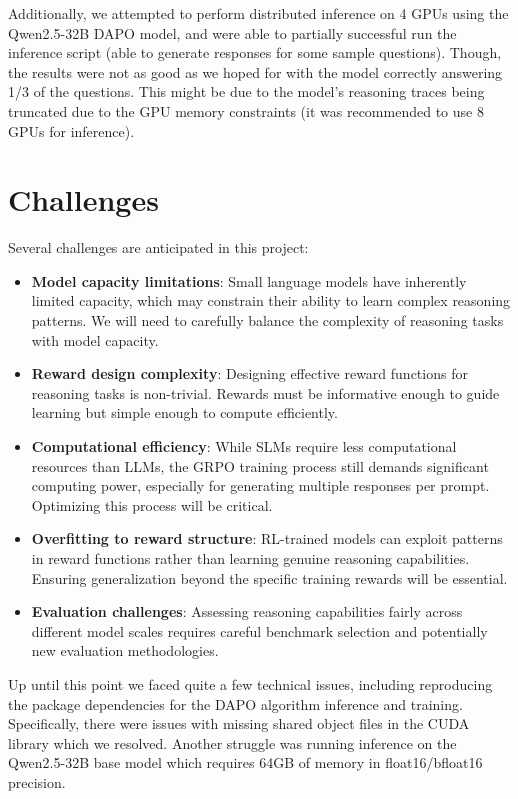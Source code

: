 \documentclass[11pt, oneside]{article}   	%
\begin{document}
Additionally, we attempted to perform distributed inference on 4 GPUs using the Qwen2.5-32B DAPO model, and were able to partially successful run the inference script (able to generate responses for some sample questions). Though, the results were not as good as we hoped for with the model correctly answering 1/3 of the questions. This might be due to the model's reasoning traces being truncated due to the GPU memory constraints (it was recommended to use 8 GPUs for inference).
\section*{Challenges}

Several challenges are anticipated in this project:

\begin{itemize}
	\item \textbf{Model capacity limitations}: Small language models have inherently limited capacity, which may constrain their ability to learn complex reasoning patterns. We will need to carefully balance the complexity of reasoning tasks with model capacity.

	\item \textbf{Reward design complexity}: Designing effective reward functions for reasoning tasks is non-trivial. Rewards must be informative enough to guide learning but simple enough to compute efficiently.

	\item \textbf{Computational efficiency}: While SLMs require less computational resources than LLMs, the GRPO training process still demands significant computing power, especially for generating multiple responses per prompt. Optimizing this process will be critical.

	\item \textbf{Overfitting to reward structure}: RL-trained models can exploit patterns in reward functions rather than learning genuine reasoning capabilities. Ensuring generalization beyond the specific training rewards will be essential.

	\item \textbf{Evaluation challenges}: Assessing reasoning capabilities fairly across different model scales requires careful benchmark selection and potentially new evaluation methodologies.
\end{itemize}

Up until this point we faced quite a few technical issues, including reproducing the package dependencies for the DAPO algorithm inference and training. Specifically, there were issues with missing shared object files in the CUDA library which we resolved. Another struggle was running inference on the Qwen2.5-32B base model which requires 64GB of memory in float16/bfloat16 precision.
\end{document}
